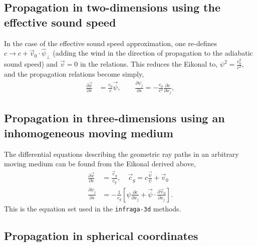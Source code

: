\documentclass[10pt]{article}
\begin{document}
\newpage

\subsection{Propagation in two-dimensions using the effective sound speed}

In the case of the effective sound speed approximation, one re-defines \(c \rightarrow c + \vec{v}_0 \cdot \hat{\psi}_\perp\) (adding the wind in the direction of propagation to the adiabatic sound speed) and \(\vec{v} = 0\) in the relations.  This reduces the Eikonal to, \(\psi^2 = \frac{c_0^2}{c^2}\), and the propagation relations become simply,
\begin{subequations}
 \begin{align}
 \frac{\partial \vec{x}}{\partial s} &= \frac{c_0}{c} \vec{\psi} , \quad \quad \frac{\partial \psi_j}{\partial s} = - \frac{c_0}{c^2} \frac{\partial c}{\partial x_j} ,
 \end{align}
\end{subequations}



\subsection{Propagation in three-dimensions using an inhomogeneous moving medium}
The differential equations describing the geometric ray paths in an arbitrary moving medium can be found from the Eikonal derived above,
\begin{subequations}
 \begin{align}
 \frac{\partial \vec{x}}{\partial s} &= \frac{\vec{c}_g}{c_g}, \quad \vec{c}_g = c \frac{\vec{\psi}}{\psi} + \vec{v}_0 \\
 \frac{\partial \psi_j}{\partial s} & = - \frac{1}{c_g} \left[ \psi \frac{\partial c}{\partial x_j} + \vec{\psi} \cdot \frac{\partial \vec{v}_0}{\partial x_j} \right].
 \end{align}
\end{subequations}
This is the equation set used in the \verb=infraga-3d= methods.


\subsection{Propagation in spherical coordinates}
\end{document}

